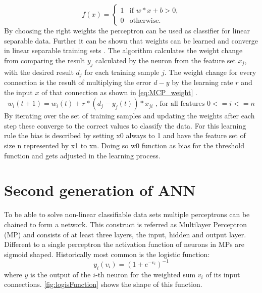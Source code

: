 \begin{equation}\label{eq:MCP}
  f(x) =
    \begin{cases}
      1 & \text{if $w*x+b > 0$,} \\
      0 & \text{otherwise.}
    \end{cases}  
\end{equation}
By choosing the right weights the perceptron can be used as classifier for linear separable data. Further it can be shown that weights can be learned and converge in linear separable training sets \cite{Bishop:998831}. The algorithm calculates the weight change from comparing the result $y_j$ calculated by the neuron from the feature set $x_j$, with the desired result $d_j$ for each training sample $j$. The weight change for every connection is the result of multiplying the error $d-y$ by the learning rate $r$ and the input $x$ of that connection as shown in \autoref{eq:MCP_weight} .
\newline
\begin{equation}\label{eq:MCP_weight}
  w_i(t+1) = w_i(t) +r * (d_j - y_j(t))*x_{ji} \text{ , for all features $0<=i<=n$}
\end{equation}
By iterating over the set of training samples and updating the weights after each step these converge to the correct values to classify the data.
\newline
For this learning rule the bias is described by setting x0 always to 1 and have the feature set of size n represented by x1 to xn. Doing so w0 function as bias for the threshold function and gets adjusted in the learning process.

\section{Second generation of ANN}
To be able to solve non-linear classifiable data sets multiple perceptrons can be chained to form a network. This construct is referred as Multilayer Perceptron (MP) and consists of at least three layers, the input, hidden and output layer. Different to a single perceptron the activation function of neurons in MPs are sigmoid shaped. Historically most common is the logistic function:
\begin{equation}\label{eq:logisFunc}
  y_i(v_i) = (1 + e^{-v_i})^{-1}
\end{equation}
where $y$ is the output of the $i$-th neuron for the weighted sum $v_i$ of its input connections.
\autoref{fig:logisFunction} shows the shape of this function.

